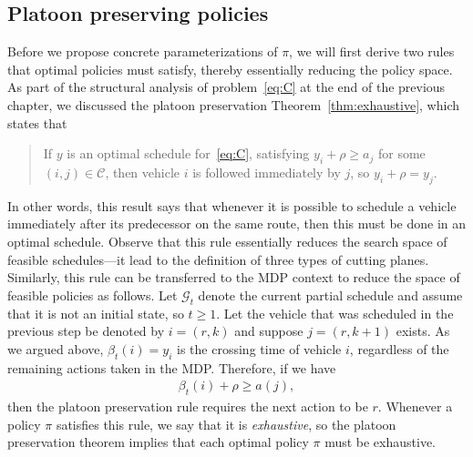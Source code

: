 \documentclass[a4paper]{report}
\theoremstyle{definition}
\theoremstyle{plain}
\begin{document}



\subsection{Platoon preserving policies}

Before we propose concrete parameterizations of $\pi$, we will first derive two
rules that optimal policies must satisfy, thereby essentially reducing the
policy space.
%
As part of the structural analysis of problem~\eqref{eq:C} at the end of the previous
chapter, we discussed the platoon preservation Theorem~\ref{thm:exhaustive}, which states that
\begin{quote}
  If $y$ is an optimal schedule for~\eqref{eq:C}, satisfying $y_{i} + \rho \geq a_{j}$ for some
  $(i,j) \in \mathcal{C}$, then vehicle $i$ is followed immediately by $j$, so
  $y_{i} + \rho = y_{j}$.
\end{quote}
%
In other words, this result says that whenever it is possible to schedule a
vehicle immediately after its predecessor on the same route, then this must be
done in an optimal schedule.
%
Observe that this rule essentially reduces the search space of feasible
schedules---it lead to the definition of three types of cutting planes.
%
Similarly, this rule can be transferred to the MDP context to reduce the space
of feasible policies as follows. Let $\mathcal{G}_t$ denote the current partial
schedule and assume that it is not an initial state, so $t \geq 1$. Let the
vehicle that was scheduled in the previous step be denoted by $i = (r, k)$ and
suppose $j = (r, k+1)$ exists.
%
As we argued above, $\beta_t(i) = y_{i}$ is the crossing time of vehicle $i$,
regardless of the remaining actions taken in the MDP.
%
Therefore, if we have
\begin{align}\label{eq:rule-exhaustive}
  \beta_t(i) + \rho \geq a(j),
\end{align}
then the platoon preservation rule requires the next action to be $r$.
%
Whenever a policy $\pi$ satisfies this rule, we say that it is
\emph{exhaustive}, so the platoon preservation theorem implies that each optimal
policy $\pi$ must be exhaustive.
\end{document}
